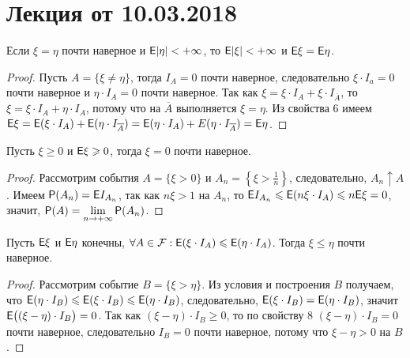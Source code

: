 \section{Лекция от 10.03.2018}
\begin{property}
	Если $\xi = \eta$ почти наверное и $\E | \eta| < +\infty$, то $\E | \xi| < +\infty$ и $\E \xi = \E \eta$.
	\begin{proof}
		Пусть $A = \{ \xi \neq \eta \}$, тогда $I_A = 0$ почти наверное, следовательно $\xi \cdot I_a = 0$ почти наверное и $\eta \cdot I_A = 0$ почти наверное. Так как $\xi = \xi \cdot I_A + \xi \cdot I_{\overline A}$, то $\xi = \xi \cdot I_A + \eta \cdot I_A$, потому что на $\overline A$ выполняется $\xi = \eta$. Из свойства 6 имеем $\E \xi = \E ( \xi \cdot I_A ) + \E (\eta \cdot I_{\overline A} ) = \E ( \eta \cdot I_A) + E ( \eta \cdot I_{\overline A} ) = \E \eta$. 
	\end{proof}
\end{property}
\begin{property}
	Пусть $\xi \geqslant 0$ и $\E \xi \geqslant 0$, тогда $\xi = 0$ почти наверное.
	\begin{proof}
		Рассмотрим события $A = \{ \xi > 0 \}$ и $A_n = \left\{ \xi > \frac{1}{n} \right\} $, следовательно, $A_n \uparrow A$. Имеем $\P (A_n) = \E I_{A_n}$, так как $n\xi > 1$ на $A_n$, то  $\E I_{A_n} \leqslant \E (n\xi \cdot I_A) \leqslant n \E \xi = 0$, значит, $\P(A) = \lim\limits_{n \rightarrow +\infty} \P (A_n)$.
	\end{proof}
\end{property}
\begin{property}
	Пусть $\E \xi$ и $\E \eta$ конечны, $\forall A \in \F: \E (\xi \cdot I_A) \leqslant \E ( \eta \cdot I_A)$. Тогда  $\xi \leqslant \eta$ почти наверное.
	\begin{proof}
		Рассмотрим событие $B = \{ \xi > \eta \}$. Из условия и построения $B$ получаем, что $\E (\eta \cdot I_B) \leqslant \E (\xi \cdot I_B) \leqslant \E (\eta \cdot I_B)$, следовательно, $\E( \xi \cdot I_B) = \E(\eta \cdot I_B)$, значит $\E \big( (\xi - \eta) \cdot I_B \big) = 0$. Так как $(\xi - \eta) \cdot I_B \geqslant 0$, то по свойству 8 $(\xi - \eta) \cdot I_B = 0$ почти наверное, следовательно $I_B = 0$ почти наверное, потому что $\xi- \eta > 0$ на $B$.
	\end{proof}
\end{property}
